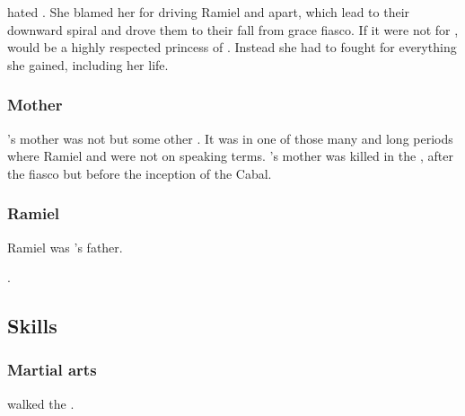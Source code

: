 \subsubsection{\Eryal}
\Cishiel{} hated \Eryal. 
She blamed her for driving Ramiel and \Shiaraid{} apart, which lead to their downward spiral and drove them to their fall from grace \malach{} fiasco. 
If it were not for \Eryal, \Cishiel{} would be a highly respected princess of \Mystraacht. 
Instead she had to fought for everything she gained, including her life.





\subsubsection{Mother}
\Cishiel's mother was not \Shiaraid but some other \resvil.
It was in one of those many and long periods where Ramiel and \Shiaraid were not on speaking terms.
\Cishiel's mother was killed in the \resphanwars, after the \malach fiasco but before the inception of the Cabal.





\subsubsection{Ramiel}
Ramiel was \Cishiel's father. 

.








\subsection{Skills}





\subsubsection{Martial arts}
\Cishiel walked the .
















